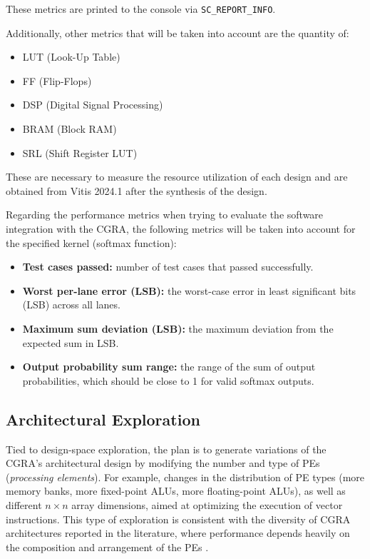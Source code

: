\documentclass[conference]{IEEEtran}
\begin{document}
These metrics are printed to the console via \texttt{SC\_REPORT\_INFO}.

Additionally, other metrics that will be taken into account are the quantity of:
\begin{itemize}
    \item LUT (Look-Up Table)
    \item FF (Flip-Flops)
    \item DSP (Digital Signal Processing)
    \item BRAM (Block RAM)
    \item SRL (Shift Register LUT)
\end{itemize}
These are necessary to measure the resource utilization of each design and are obtained from Vitis 2024.1 after the synthesis of the design.


Regarding the performance metrics when trying to evaluate the software integration with the CGRA, the following metrics will be taken into account for the specified kernel (softmax function):
\begin{itemize}
    \item \textbf{Test cases passed:} number of test cases that passed successfully.
    \item \textbf{Worst per-lane error (LSB):} the worst-case error in least significant bits (LSB) across all lanes.
    \item \textbf{Maximum sum deviation (LSB):} the maximum deviation from the expected sum in LSB.
    \item \textbf{Output probability sum range:} the range of the sum of output probabilities, which should be close to 1 for valid softmax outputs.
\end{itemize}




\subsection{Architectural Exploration}

Tied to design-space exploration, the plan is to generate variations of the CGRA's architectural design by modifying the number and type of PEs (\textit{processing elements}). 
For example, changes in the distribution of PE types (more memory banks, more fixed-point ALUs, more floating-point ALUs), as well as different $n \times n$ array dimensions, aimed at optimizing the execution of vector instructions.
This type of exploration is consistent with the diversity of CGRA architectures reported in the literature, where performance depends heavily on the composition and arrangement of the PEs \cite{Podobas}.
\end{document}
